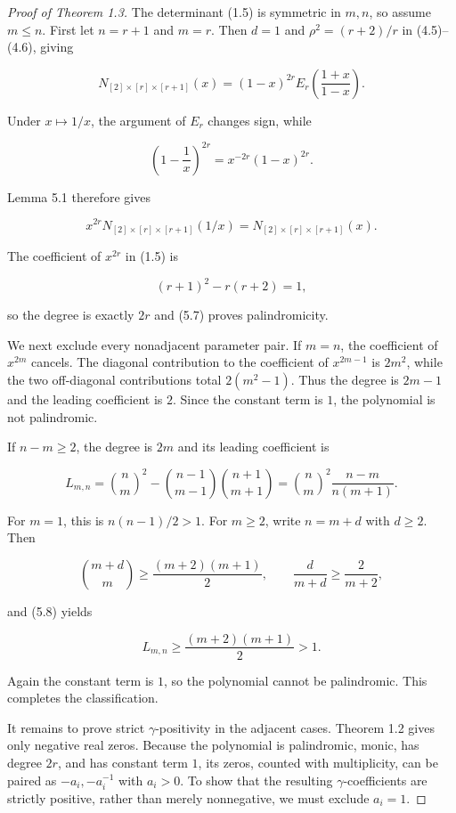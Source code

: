 \documentclass[11pt]{article}
\numberwithin{equation}{section}
\begin{document}
\begin{proof}[Proof of Theorem 1.3]

The determinant (1.5) is symmetric in $m,n$, so assume $m\leq n$.
First let $n=r+1$ and $m=r$. Then $d=1$ and
$\rho^2=(r+2)/r$ in (4.5)--(4.6), giving

\nopagebreak[4]
\[
N_{[2]\times[r]\times[r+1]}(x)
=(1-x)^{2r}
E_r\!\left(\frac{1+x}{1-x}\right).
\tag{5.6}
\]

Under $x\mapsto1/x$, the argument of $E_r$ changes sign, while

\nopagebreak[4]
\[
\left(1-\frac1x\right)^{2r}=x^{-2r}(1-x)^{2r}.
\]

Lemma 5.1 therefore gives

\nopagebreak[4]
\[
x^{2r}N_{[2]\times[r]\times[r+1]}(1/x)
=N_{[2]\times[r]\times[r+1]}(x).
\tag{5.7}
\]

The coefficient of $x^{2r}$ in (1.5) is

\nopagebreak[4]
\[
(r+1)^2-r(r+2)=1,
\]

so the degree is exactly $2r$ and (5.7) proves palindromicity.

We next exclude every nonadjacent parameter pair. If $m=n$, the coefficient of
$x^{2m}$ cancels. The diagonal contribution to the coefficient of
$x^{2m-1}$ is $2m^2$, while the two off-diagonal contributions total
$2(m^2-1)$. Thus the degree is $2m-1$ and the leading coefficient is $2$.
Since the constant term is $1$, the polynomial is not palindromic.

If $n-m\geq2$, the degree is $2m$ and its leading coefficient is

\nopagebreak[4]
\[
L_{m,n}
=\binom nm^{\!2}
-\binom{n-1}{m-1}\binom{n+1}{m+1}
=\binom nm^{\!2}\frac{n-m}{n(m+1)}.
\tag{5.8}
\]

For $m=1$, this is $n(n-1)/2>1$. For $m\geq2$, write
$n=m+d$ with $d\geq2$. Then

\nopagebreak[4]
\[
\binom{m+d}{m}\geq\frac{(m+2)(m+1)}2,
\qquad
\frac{d}{m+d}\geq\frac2{m+2},
\]

and (5.8) yields

\nopagebreak[4]
\[
L_{m,n}\geq\frac{(m+2)(m+1)}2>1.
\]

Again the constant term is $1$, so the polynomial cannot be palindromic.
This completes the classification.

It remains to prove strict $\gamma$-positivity in the adjacent cases. Theorem
1.2 gives only negative real zeros. Because the polynomial is palindromic,
monic, has degree $2r$, and has constant term $1$, its zeros, counted with
multiplicity, can be paired as $-a_i,-a_i^{-1}$ with $a_i>0$. To show that the
resulting $\gamma$-coefficients are strictly positive, rather than merely
nonnegative, we must exclude $a_i=1$.


\end{proof}
\end{document}
